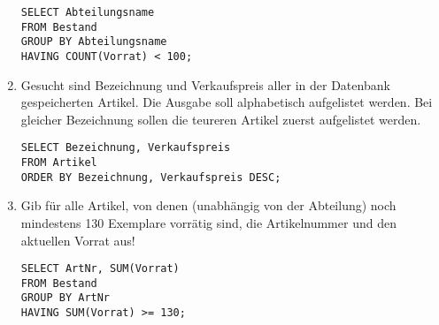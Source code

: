 \documentclass{bschlangaul-aufgabe}
\begin{document}
\begin{enumerate}
\begin{bAntwort}
\begin{verbatim}
SELECT Abteilungsname
FROM Bestand
GROUP BY Abteilungsname
HAVING COUNT(Vorrat) < 100;
\end{verbatim}
\end{bAntwort}


\item Gesucht sind Bezeichnung und Verkaufspreis aller in der Datenbank
gespeicherten Artikel. Die Ausgabe soll alphabetisch aufgelistet werden.
Bei gleicher Bezeichnung sollen die teureren Artikel zuerst aufgelistet
werden.

\begin{bAntwort}
\begin{verbatim}
SELECT Bezeichnung, Verkaufspreis
FROM Artikel
ORDER BY Bezeichnung, Verkaufspreis DESC;
\end{verbatim}
\end{bAntwort}


\item Gib für alle Artikel, von denen (unabhängig von der Abteilung)
noch mindestens 130 Exemplare vorrätig sind, die Artikelnummer und den
aktuellen Vorrat aus!

\begin{bAntwort}
\begin{verbatim}
SELECT ArtNr, SUM(Vorrat)
FROM Bestand
GROUP BY ArtNr
HAVING SUM(Vorrat) >= 130;
\end{verbatim}
\end{bAntwort}
\end{enumerate}

%

\end{document}

